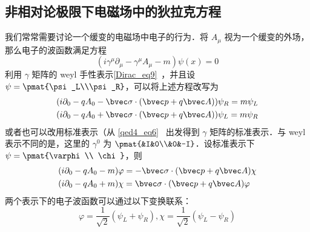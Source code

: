\subsection{非相对论极限下电磁场中的狄拉克方程}
我们常常需要讨论一个缓变的电磁场中电子的行为．将 $A_\mu$ 视为一个缓变的外场，那么电子的波函数满足方程
\begin{equation}
(i\gamma^\mu \partial_\mu -\gamma^\mu A_\mu - m)\psi(x)=0
\end{equation}
利用 $\gamma$ 矩阵的 weyl 手性表示\autoref{Dirac_eq9}~，并且设 $\psi = \pmat{\psi_L\\\psi_R}$，可以将上述方程改写为
\begin{equation}
\begin{aligned}
&(i\partial_0 - qA_0-\bvec \sigma\cdot (\bvec p+q\bvec A))\psi_R=m\psi_L\\
&(i\partial_0-qA_0+\bvec \sigma\cdot (\bvec p+q\bvec A))\psi_L = m\psi_R
\end{aligned}
\end{equation}
或者也可以改用标准表示（从 \autoref{qed4_eq6}~ 出发得到 $\gamma$ 矩阵的标准表示．与 weyl 表示不同的是，这里的 $\gamma^0$ 为 $\pmat{&I&0\\&0&-I}$．设标准表示下 $\psi=\pmat{\varphi\\ \chi}$，则
\begin{equation}
\begin{aligned}
&(i\partial_0-qA_0-m)\varphi=-\bvec \sigma\cdot (\bvec p+q\bvec A)\chi\\
&(i\partial_0-qA_0+m)\chi=\bvec \sigma\cdot (\bvec p+q\bvec A)\varphi
\end{aligned}
\end{equation}
两个表示下的电子波函数可以通过以下变换联系：
\begin{equation}
\varphi = \frac{1}{\sqrt{2}}(\psi_L+\psi_R),\chi = \frac{1}{\sqrt{2}}(\psi_L-\psi_R)
\end{equation}
